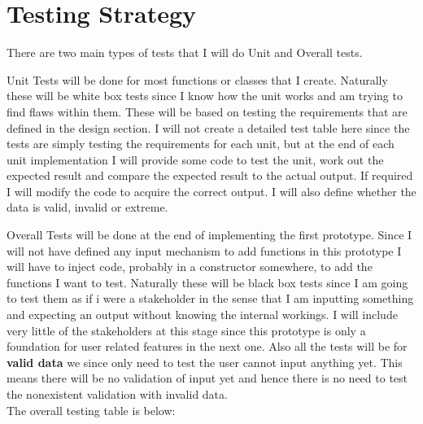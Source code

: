 \documentclass[../../../../main.tex]{subfiles}
\begin{document}
\section{Testing Strategy}
There are two main types of tests that I will do Unit and Overall tests.


Unit Tests will be done for most functions or classes that I create. Naturally these will be white box tests since I  know how the unit works and am trying to find flaws within them. These will be based on testing the requirements that are defined in the design section. I will not create a detailed test table here since the tests are simply testing the requirements for each unit, but at the end of each unit implementation I will provide some code to test the unit, work out the expected result and compare the expected result to the actual output. If required I will modify the code to acquire the correct output. I will also define whether the data is valid, invalid or extreme.


Overall Tests will be done at the end of implementing the first prototype. Since I will not have defined any input mechanism to add functions in this prototype I will have to inject code, probably in a constructor somewhere, to add the functions I want to test. Naturally these will be black box tests since I am going to test them as if i were a stakeholder in the sense that I am inputting something and expecting an output without knowing the internal workings. I will include very little of the stakeholders at this stage since this prototype is only a foundation for user related features in the next one. Also all the tests will be for \textbf{valid data} we since only need to test the user cannot input anything yet. This means there will be no validation of input yet and hence there is no need to test the nonexistent validation with invalid data.\\
The overall testing table is below:
\end{document}
